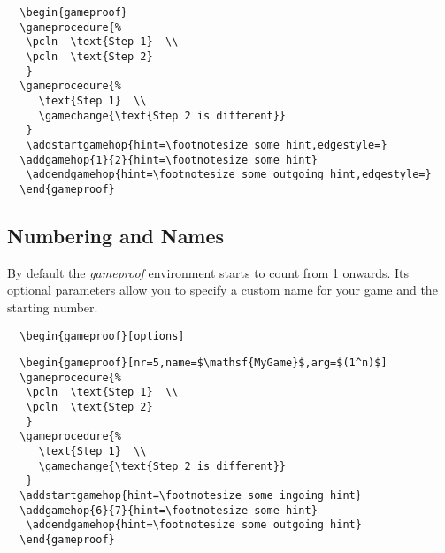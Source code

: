 \documentclass[a4paper]{report}
\begin{document}
  
  \begin{lstlisting}
  \begin{gameproof}
  \gameprocedure{%
   \pcln  \text{Step 1}  \\
   \pcln  \text{Step 2}  
   }
  \gameprocedure{%
	 \text{Step 1}  \\
	 \gamechange{\text{Step 2 is different}}  
   }
   \addstartgamehop{hint=\footnotesize some hint,edgestyle=}
  \addgamehop{1}{2}{hint=\footnotesize some hint}
   \addendgamehop{hint=\footnotesize some outgoing hint,edgestyle=}
  \end{gameproof}
  \end{lstlisting}
  
  \subsection{Numbering and Names}
  By default the \emph{gameproof} environment starts to count from 1 onwards. Its optional parameters allow you to specify a custom
  name for your game and the starting number.
  \begin{lstlisting}
  \begin{gameproof}[options]
  \end{lstlisting}
  
  \begin{center}
  \begin{gameproof}[nr=5,name=\mathsf{MyGame},arg=(1^n)]
  \end{gameproof}
  \end{center}
  
  \begin{lstlisting}
  \begin{gameproof}[nr=5,name=$\mathsf{MyGame}$,arg=$(1^n)$]
  \gameprocedure{%
   \pcln  \text{Step 1}  \\
   \pcln  \text{Step 2}  
   }
  \gameprocedure{%
	 \text{Step 1}  \\
	 \gamechange{\text{Step 2 is different}}  
   }
  \addstartgamehop{hint=\footnotesize some ingoing hint}
  \addgamehop{6}{7}{hint=\footnotesize some hint}
   \addendgamehop{hint=\footnotesize some outgoing hint}
  \end{gameproof}
  \end{lstlisting}
  
\end{document}
